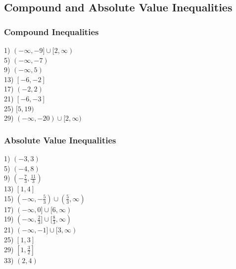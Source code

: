 \documentclass[11pt]{book}
\begin{document}
\subsection*{Compound and Absolute Value Inequalities}

\subsubsection{Compound Inequalities}

\begin{multicols}{2}
1) $(-\infty,-9]\cup[2,\infty)$\\
5) $(-\infty,-7)$\\
9) $(-\infty,5)$\\
13) $[-6,-2]$\\
17) $(-2,2)$\\
21) $[-6,-3]$\\
25) $[5,19)$\\
29) $(-\infty,-20)\cup[2,\infty)$
\end{multicols}

\subsubsection{Absolute Value Inequalities}

\begin{multicols}{2}
1) $(-3,3)$\\
5) $(-4,8)$\\
9) $(-\frac{7}{3},\frac{11}{3})$\\
13) $[1,4]$\\
15) $(-\infty,-\frac{5}{3})\cup(\frac{5}{3},\infty)$\\
17) $(-\infty,0]\cup[6,\infty)$\\
19) $(-\infty,\frac{2}{3}]\cup[\frac{8}{3},\infty)$\\
21) $(-\infty,-1]\cup[3,\infty)$\\
25) $[1,3]$\\
29) $[1,\frac{3}{2}]$\\
33) $(2,4)$
\end{multicols}
\end{document}
